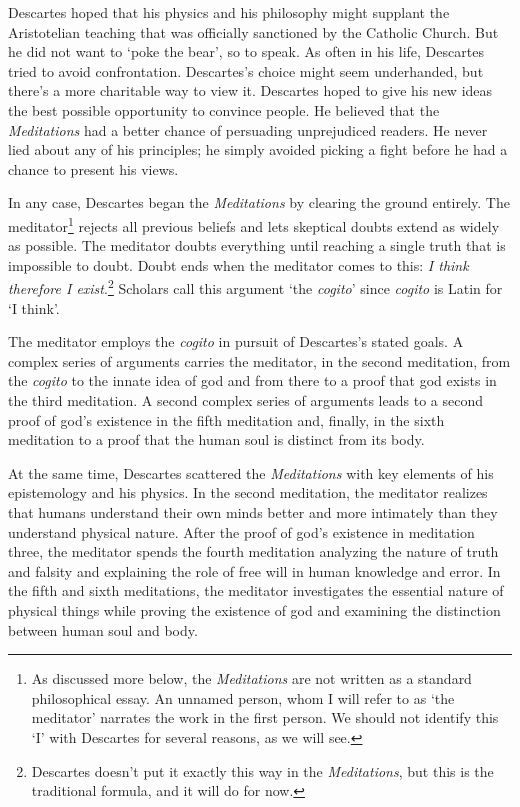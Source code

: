 Descartes hoped that his physics and his philosophy might supplant the Aristotelian teaching that was officially sanctioned by the Catholic Church. But he did not want to `poke the bear', so to speak. As often in his life, Descartes tried to avoid confrontation. Descartes's choice might seem underhanded, but there's a more charitable way to view it. Descartes hoped to give his new ideas the best possible opportunity to convince people. He believed that the \textit{Meditations} had a better chance of persuading unprejudiced readers. He never lied about any of his principles; he simply avoided picking a fight before he had a chance to present his views.

In any case, Descartes began the \textit{Meditations} by clearing the ground entirely. The meditator\footnote{As discussed more below, the \textit{Meditations} are not written as a standard philosophical essay. An unnamed person, whom I will refer to as `the meditator' narrates the work in the first person. We should not identify this `I' with Descartes for several reasons, as we will see.} rejects all previous beliefs and lets skeptical doubts extend as widely as possible. The meditator doubts everything until reaching a single truth that is impossible to doubt. Doubt ends when the meditator comes to this: \textit{I think therefore I exist}.\footnote{Descartes doesn't put it exactly this way in the \textit{Meditations}, but this is the traditional formula, and it will do for now.} Scholars call this argument `the \textit{cogito}' since \textit{cogito} is Latin for `I think'.

The meditator employs the \textit{cogito} in pursuit of Descartes's stated goals. A complex series of arguments carries the meditator, in the second meditation, from the \textit{cogito} to the innate idea of god and from there to a proof that god exists in the third meditation. A second complex series of arguments leads to a second proof of god's existence in the fifth meditation and, finally, in the sixth meditation to a proof that the human soul is distinct from its body.

At the same time, Descartes scattered the \textit{Meditations} with key elements of his epistemology and his physics. In the second meditation, the meditator realizes that humans understand their own minds better and more intimately than they understand physical nature. After the proof of god's existence in meditation three, the meditator spends the fourth meditation analyzing the nature of truth and falsity and explaining the role of free will in human knowledge and error. In the fifth and sixth meditations, the meditator investigates the essential nature of physical things while proving the existence of god and examining the distinction between human soul and body.

